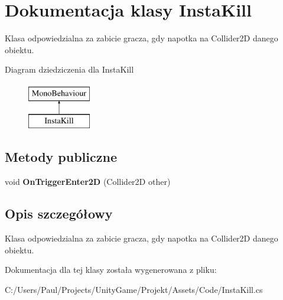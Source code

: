 \section{Dokumentacja klasy Insta\+Kill}
\label{class_insta_kill}


Klasa odpowiedzialna za zabicie gracza, gdy napotka na Collider2\+D danego obiektu.  


Diagram dziedziczenia dla Insta\+Kill\begin{figure}[H]
\begin{center}
\leavevmode
\includegraphics[height=2.000000cm]{class_insta_kill}
\end{center}
\end{figure}
\subsection*{Metody publiczne}
\begin{DoxyCompactItemize}
\item 
void {\bfseries On\+Trigger\+Enter2\+D} (Collider2\+D other)\label{class_insta_kill_aca897e3b9eee1c18c493e73d9c52ffe7}

\end{DoxyCompactItemize}


\subsection{Opis szczegółowy}
Klasa odpowiedzialna za zabicie gracza, gdy napotka na Collider2\+D danego obiektu. 



Dokumentacja dla tej klasy została wygenerowana z pliku\+:\begin{DoxyCompactItemize}
\item 
C\+:/\+Users/\+Paul/\+Projects/\+Unity\+Game/\+Projekt/\+Assets/\+Code/Insta\+Kill.\+cs\end{DoxyCompactItemize}
